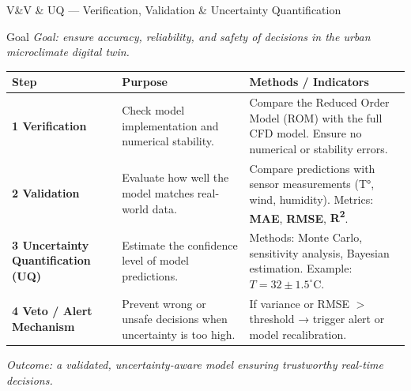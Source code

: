 \documentclass{beamer}
\begin{document}
\begin{frame}{V\&V \& UQ — Verification, Validation \& Uncertainty Quantification}
\centering
\tiny
\begin{block}{Goal}
    \textit{Goal: ensure accuracy, reliability, and safety of decisions in the urban microclimate digital twin.}
\end{block}
\vspace{0.4cm}
\begin{tabular}{|p{2.5cm}|p{3.5cm}|p{4.2cm}|}
\hline
\textbf{Step} & \textbf{Purpose} & \textbf{Methods / Indicators} \\
\hline
\textbf{1️ Verification} &
Check model implementation and numerical stability. &
Compare the Reduced Order Model (ROM) with the full CFD model.  
Ensure no numerical or stability errors. \\
\hline
\textbf{2️ Validation} &
Evaluate how well the model matches real-world data. &
Compare predictions with sensor measurements (T°, wind, humidity).  
Metrics: \textbf{MAE}, \textbf{RMSE}, \textbf{R\textsuperscript{2}}. \\
\hline
\textbf{3️ Uncertainty Quantification (UQ)} &
Estimate the confidence level of model predictions. &
Methods: Monte Carlo, sensitivity analysis, Bayesian estimation.  
Example: $T = 32 \pm 1.5^\circ$C. \\
\hline
\textbf{4️ Veto / Alert Mechanism} &
Prevent wrong or unsafe decisions when uncertainty is too high. &
If variance or RMSE $>$ threshold → trigger alert or model recalibration. \\
\hline
\end{tabular}

\vspace{0.3cm}
\textit{Outcome: a validated, uncertainty-aware model ensuring trustworthy real-time decisions.}
\end{frame}
\end{document}

